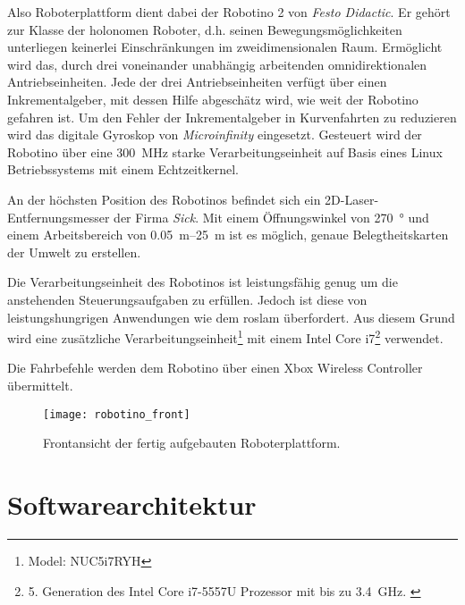Also Roboterplattform dient dabei der Robotino 2 von \textit{Festo Didactic}. Er gehört zur Klasse der holonomen Roboter, d.h. seinen Bewegungsmöglichkeiten unterliegen keinerlei Einschränkungen im zweidimensionalen Raum. Ermöglicht wird das, durch drei voneinander unabhängig arbeitenden omnidirektionalen Antriebseinheiten. Jede der drei Antriebseinheiten verfügt über einen Inkrementalgeber, mit dessen Hilfe abgeschätz wird, wie weit der Robotino gefahren ist. Um den Fehler der Inkrementalgeber in Kurvenfahrten zu reduzieren wird das digitale Gyroskop\footnotemark{} von \textit{Microinfinity} eingesetzt. Gesteuert wird der Robotino über eine \SI{300}{\MHz} starke Verarbeitungseinheit auf Basis eines Linux Betriebssystems mit einem Echtzeitkernel. \cite{festo2007robotinomanual} 

An der höchsten Position des Robotinos befindet sich ein 2D-Laser-Entfernungsmesser\footnotemark{} der Firma \textit{Sick}. Mit einem Öffnungswinkel von \SI{270}{\degree} und einem Arbeitsbereich von \SIrange{0.05}{25}{\meter} ist es möglich, genaue Belegtheitskarten der Umwelt zu erstellen. \cite{sick2016operatingmanual} 

Die Verarbeitungseinheit des Robotinos ist leistungsfähig genug um die anstehenden Steuerungsaufgaben zu erfüllen. Jedoch ist diese von leistungshungrigen Anwendungen wie dem \Gls{roslam} überfordert. Aus diesem Grund wird eine zusätzliche Verarbeitungseinheit\footnote{Model: NUC5i7RYH} mit einem Intel Core i7\footnote{5. Generation des Intel Core i7-5557U Prozessor mit bis zu \SI{3.4}{\GHz}. \cite{intel2015nucproductbrief}} verwendet.

Die Fahrbefehle werden dem Robotino über einen Xbox Wireless Controller übermittelt.

\begin{figure}
	\centering
	\texttt{[image: robotino\_front]}
	\caption{Frontansicht der fertig aufgebauten Roboterplattform.}
	\label{fig:robotino_front}
\end{figure}


%
%
\section{Softwarearchitektur}

